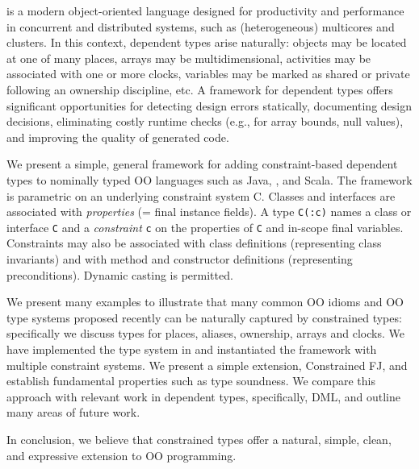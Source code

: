 \Xten{} is a modern object-oriented language designed for productivity
and performance in concurrent and distributed systems, such as
(heterogeneous) multicores and clusters. In this context, dependent
types arise naturally: objects may be located at one of many places,
arrays may be multidimensional, activities may be associated with one
or more clocks, variables may be marked as shared or private following
an ownership discipline, etc.  A framework for dependent types offers
significant opportunities for detecting design errors statically,
documenting design decisions, eliminating costly runtime checks
(e.g., for array bounds, null values), and improving the quality of
generated code.

We present a simple, general framework for adding constraint-based
dependent types to nominally typed OO languages such as Java, \Xten{},
and Scala. The framework is parametric on an underlying constraint
system {\cal C}. Classes and interfaces are associated with {\em
properties} (= final instance fields). A type {\tt C(:c)} names a class
or interface {\tt C} and a {\em constraint} {\tt c} on the
properties of {\tt C} and in-scope final variables.  Constraints
may also be associated with class definitions (representing
class invariants) and with method and constructor definitions
(representing preconditions). Dynamic casting is permitted.

We present many examples to illustrate that many common OO idioms and
OO type systems proposed recently can be naturally captured by
constrained types: specifically we discuss types for places, aliases,
ownership, arrays and clocks. We have implemented the type system
in \Xten{} and instantiated the framework with multiple constraint systems.
We present a simple \FJ{} extension,
Constrained FJ, and establish fundamental properties such as type
soundness. We compare this approach with relevant work in dependent
types, specifically, DML, and outline many areas of future work.

In conclusion, we believe that constrained types offer a natural,
simple, clean, and expressive extension to OO programming.
